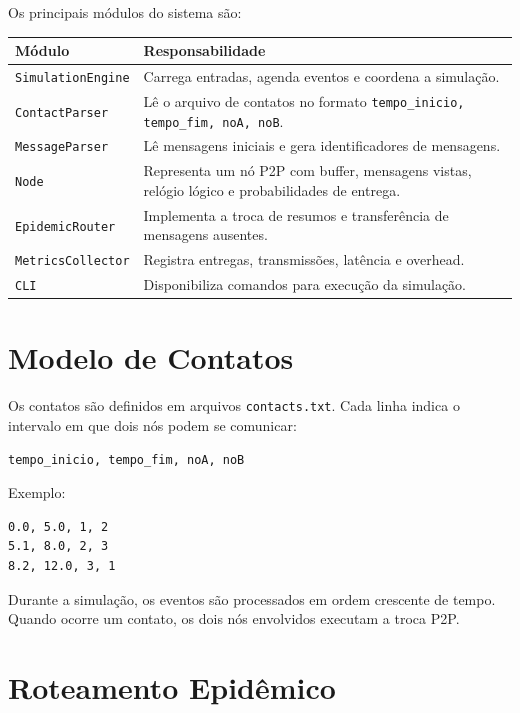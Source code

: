 \documentclass[12pt,a4paper]{article}
\begin{document}
Os principais módulos do sistema são:

\begin{table}[h]
\centering
\begin{tabular}{>{\raggedright\arraybackslash}p{4cm} >{\raggedright\arraybackslash}p{9cm}}
\toprule
\textbf{Módulo} & \textbf{Responsabilidade} \\
\midrule
\texttt{SimulationEngine} & Carrega entradas, agenda eventos e coordena a simulação. \\
\texttt{ContactParser} & Lê o arquivo de contatos no formato \texttt{tempo\_inicio, tempo\_fim, noA, noB}. \\
\texttt{MessageParser} & Lê mensagens iniciais e gera identificadores de mensagens. \\
\texttt{Node} & Representa um nó P2P com buffer, mensagens vistas, relógio lógico e probabilidades de entrega. \\
\texttt{EpidemicRouter} & Implementa a troca de resumos e transferência de mensagens ausentes. \\
\texttt{MetricsCollector} & Registra entregas, transmissões, latência e overhead. \\
\texttt{CLI} & Disponibiliza comandos para execução da simulação. \\
\bottomrule
\end{tabular}
\end{table}

\section{Modelo de Contatos}

Os contatos são definidos em arquivos \texttt{contacts.txt}. Cada linha indica o intervalo
em que dois nós podem se comunicar:

\begin{lstlisting}
tempo_inicio, tempo_fim, noA, noB
\end{lstlisting}

Exemplo:

\begin{lstlisting}
0.0, 5.0, 1, 2
5.1, 8.0, 2, 3
8.2, 12.0, 3, 1
\end{lstlisting}

Durante a simulação, os eventos são processados em ordem crescente de tempo. Quando ocorre
um contato, os dois nós envolvidos executam a troca P2P.

\section{Roteamento Epidêmico}
\end{document}
